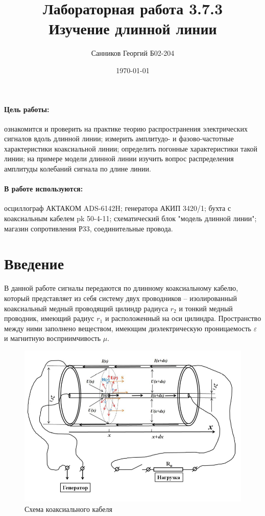 \documentclass[a4paper,12pt]{article}
\author{Санников Георгий Б02-204}
\title{Лабораторная работа 3.7.3 \\
	\textbf{Изучение длинной линии}}
\date{\today}
\theoremstyle{definition}
\begin{document}
	
{\Large \maketitle}

	\paragraph*{Цель работы:} ознакомится и проверить на практике теорию распространения
	электрических сигналов вдоль длинной линии; измерить амплитудо- и фазово-частотные
	характеристики коаксиальной линии; определить погонные характеристики такой
	линии; на примере модели длинной линии изучить вопрос распределения амплитуды
	колебаний сигнала по длине линии.
	\paragraph*{В работе используются:} осциллограф АКТАКОМ ADS-6142H; генератора АКИП 3420/1; бухта с коаксиальным кабелем pk 50-4-11; 
	схематический блок "модель длинной линии"; магазин сопротивления Р33, соединительные провода.

	\section{Введение}
	В данной работе сигналы передаются по длинному коаксиальному кабелю, который представляет из себя систему двух проводников -- изолированный коаксиальный медный проводящий цилиндр радиуса $r_2$ и тонкий медный проводник, имеющий радиус $r_1$ и расположенный на оси цилиндра. Пространство между ними заполнено веществом, имеющим диэлектрическую проницаемость $\varepsilon$ и магнитную восприимчивость $\mu$.
	
	\begin{figure}[h]
		\centering
		\includegraphics[scale=1]{cabel.png}
		\caption{Схема коаксиального кабеля}
	\end{figure}
	
\end{document}
